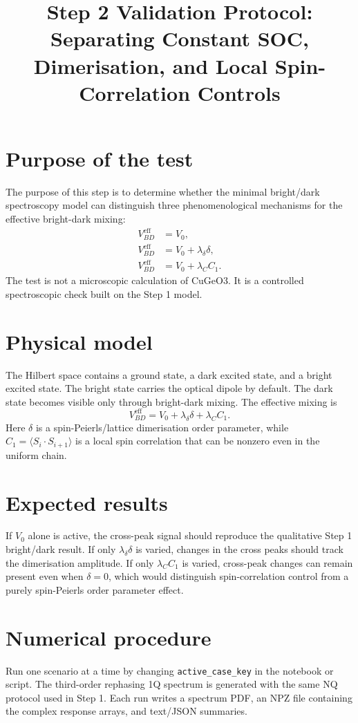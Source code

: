 \documentclass[11pt]{article}
\title{Step 2 Validation Protocol: Separating Constant SOC, Dimerisation, and Local Spin-Correlation Controls}
\author{}
\date{}
\begin{document}
\maketitle

\section{Purpose of the test}
The purpose of this step is to determine whether the minimal bright/dark
spectroscopy model can distinguish three phenomenological mechanisms for the
effective bright-dark mixing:
\begin{align}
V_{BD}^{\mathrm{eff}} &= V_0,\\
V_{BD}^{\mathrm{eff}} &= V_0 + \lambda_\delta \delta,\\
V_{BD}^{\mathrm{eff}} &= V_0 + \lambda_C C_1.
\end{align}
The test is not a microscopic calculation of CuGeO3.  It is a controlled
spectroscopic check built on the Step 1 model.

\section{Physical model}
The Hilbert space contains a ground state, a dark excited state, and a bright
excited state.  The bright state carries the optical dipole by default.  The
dark state becomes visible only through bright-dark mixing.  The effective
mixing is
\begin{equation}
V_{BD}^{\mathrm{eff}} =
V_0 + \lambda_\delta \delta + \lambda_C C_1.
\end{equation}
Here $\delta$ is a spin-Peierls/lattice dimerisation order parameter, while
$C_1=\langle S_i\cdot S_{i+1}\rangle$ is a local spin correlation that can be
nonzero even in the uniform chain.

\section{Expected results}
If $V_0$ alone is active, the cross-peak signal should reproduce the qualitative
Step 1 bright/dark result.  If only $\lambda_\delta\delta$ is varied, changes in
the cross peaks should track the dimerisation amplitude.  If only
$\lambda_C C_1$ is varied, cross-peak changes can remain present even when
$\delta=0$, which would distinguish spin-correlation control from a purely
spin-Peierls order parameter effect.

\section{Numerical procedure}
Run one scenario at a time by changing \texttt{active\_case\_key} in the
notebook or script.  The third-order rephasing 1Q spectrum is generated with
the same NQ protocol used in Step 1.  Each run writes a spectrum PDF, an NPZ
file containing the complex response arrays, and text/JSON summaries.
\end{document}
